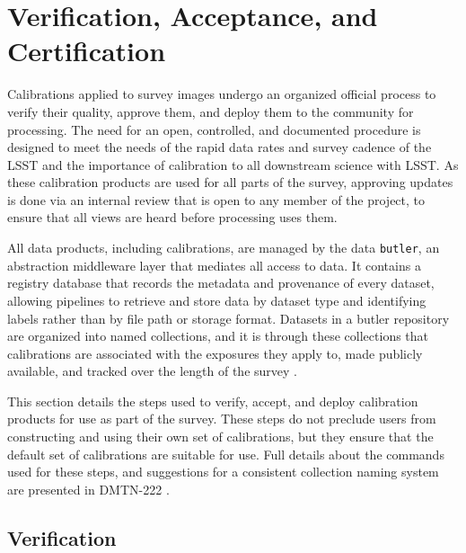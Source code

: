 \section{Verification, Acceptance, and Certification} \label{sec:verify-accept-certify}

Calibrations applied to survey images undergo an organized official process to verify their quality, approve them, and deploy them to the community for processing. The need for an open, controlled, and documented procedure is designed to meet the needs of the rapid data rates and survey cadence of the LSST and  the importance of calibration to all downstream science with LSST.
As these calibration products are used for all parts of the survey, approving updates is done via an internal review that is open to any member of the project, to ensure that all views are heard before processing uses them.

All data products, including calibrations, are managed by the data \texttt{butler}, an abstraction middleware layer that mediates all access to data. It contains a registry database that records the metadata and provenance of every dataset, allowing pipelines to retrieve and store data by dataset type and identifying labels rather than by file path or storage format.
Datasets in a butler repository are organized into named collections, and it is through these collections that calibrations are associated with the exposures they apply to, made publicly available, and tracked over the length of the survey \citep[see][for details]{2022SPIE12189E..11J}.

This section details the steps used to verify, accept, and deploy calibration products for use as part of the survey.
These steps do not preclude users from constructing and using their own set of calibrations, but they ensure that the default set of calibrations are suitable for use.
Full details about the commands used for these steps, and suggestions for a consistent collection naming system are presented in DMTN-222 \citep{DMTN-222}.


\subsection{Verification} \label{sec:verify-accept-certify:verification}

